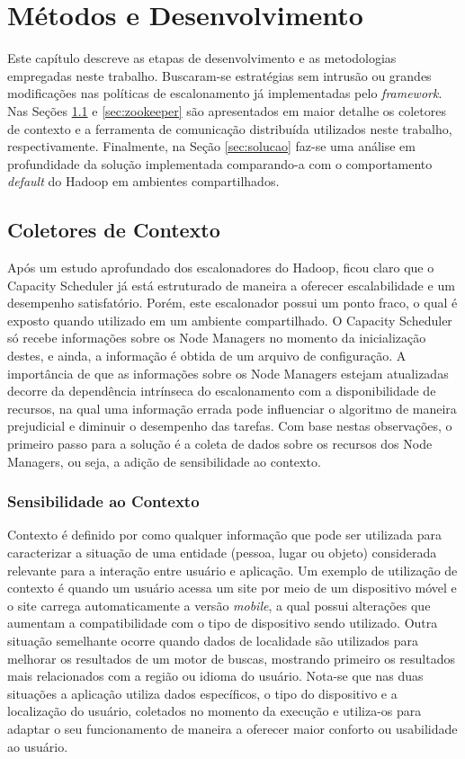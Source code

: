 \chapter{Métodos e Desenvolvimento}
\label{cap:desen}
Este capítulo descreve as etapas de desenvolvimento e as metodologias empregadas neste trabalho. Buscaram-se estratégias sem intrusão ou grandes modificações nas políticas de escalonamento já implementadas pelo \textit{framework}. Nas Seções \ref{sec:collector} e \ref{sec:zookeeper} são apresentados em maior detalhe os coletores de contexto e a ferramenta de comunicação distribuída utilizados neste trabalho, respectivamente. Finalmente, na Seção \ref{sec:solucao} faz-se uma análise em profundidade da solução implementada comparando-a com o comportamento \textit{default} do Hadoop em ambientes compartilhados.

\section{Coletores de Contexto}
\label{sec:collector}
Após um estudo aprofundado dos escalonadores do Hadoop, ficou claro que o Capacity Scheduler já está estruturado de maneira a oferecer escalabilidade e um desempenho satisfatório. Porém, este escalonador possui um ponto fraco, o qual é exposto quando utilizado em um ambiente compartilhado. O Capacity Scheduler só recebe informações sobre os Node Managers no momento da inicialização destes, e ainda, a informação é obtida de um arquivo de configuração. A importância de que as informações sobre os Node Managers estejam atualizadas decorre da dependência intrínseca do escalonamento com a disponibilidade de recursos, na qual uma informação errada pode influenciar o algoritmo de maneira prejudicial e diminuir o desempenho das tarefas. Com base nestas observações, o primeiro passo para a solução é a coleta de dados sobre os recursos dos Node Managers, ou seja, a adição de sensibilidade ao contexto.

\subsection{Sensibilidade ao Contexto}
\label{sec:ctx}
Contexto é definido por \cite{Dey} como qualquer informação que pode ser utilizada para caracterizar a situação de uma entidade (pessoa, lugar ou objeto) considerada relevante para a interação entre usuário e aplicação. Um exemplo de utilização de contexto é quando um usuário acessa um site por meio de um dispositivo móvel e o site carrega automaticamente a versão \textit{mobile}, a qual possui alterações que aumentam a compatibilidade com o tipo de dispositivo sendo utilizado. Outra situação semelhante ocorre quando dados de localidade são utilizados para melhorar os resultados de um motor de buscas, mostrando primeiro os resultados mais relacionados com a região ou idioma do usuário. Nota-se que nas duas situações a aplicação utiliza dados específicos, o tipo do dispositivo e a localização do usuário, coletados no momento da execução e utiliza-os para adaptar o seu funcionamento de maneira a oferecer maior conforto ou usabilidade ao usuário. 

